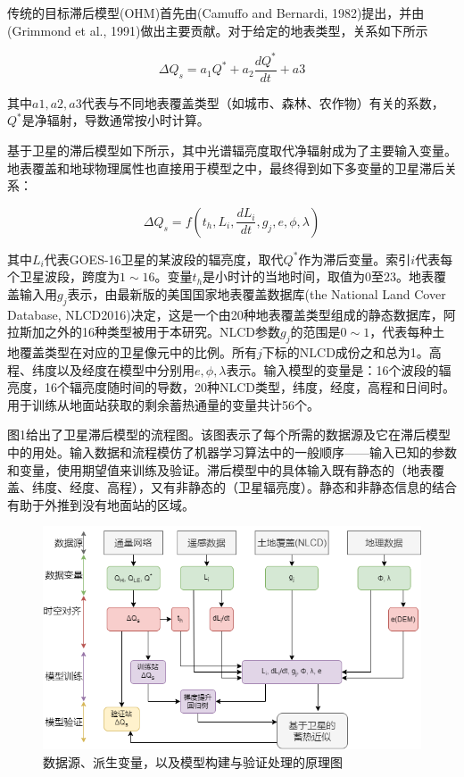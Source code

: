 \documentclass[3p,times]{elsarticle}
\begin{document}
传统的目标滞后模型(OHM)首先由(Camuffo and Bernardi, 1982)提出，并由(Grimmond et al., 1991)做出主要贡献。对于给定的地表类型，关系如下所示

\begin{equation}
    \Delta Q_s=a_1Q^*+a_2\frac{dQ^*}{dt}+a3
\end{equation}

其中$a1,a2,a3$代表与不同地表覆盖类型（如城市、森林、农作物）有关的系数，$Q^*$是净辐射，导数通常按小时计算。

基于卫星的滞后模型如下所示，其中光谱辐亮度取代净辐射成为了主要输入变量。地表覆盖和地球物理属性也直接用于模型之中，最终得到如下多变量的卫星滞后关系：

\begin{equation}
    \Delta Q_s=f(t_h,L_i,\frac{dL_i}{dt},g_j,e,\phi,\lambda)
\end{equation}

其中$L_i$代表GOES-16卫星的某波段的辐亮度，取代$Q^*$作为滞后变量。索引$i$代表每个卫星波段，跨度为$1\sim16$。变量$t_h$是小时计的当地时间，取值为$0$至$23$。地表覆盖输入用$g_j$表示，由最新版的美国国家地表覆盖数据库(the National Land Cover Database, NLCD2016)决定，这是一个由20种地表覆盖类型组成的静态数据库，阿拉斯加之外的16种类型被用于本研究。NLCD参数$g_j$的范围是$0\sim1$，代表每种土地覆盖类型在对应的卫星像元中的比例。所有$j$下标的NLCD成份之和总为1。高程、纬度以及经度在模型中分别用$e,\phi,\lambda$表示。输入模型的变量是：16个波段的辐亮度，16个辐亮度随时间的导数，20种NLCD类型，纬度，经度，高程和日间时。用于训练从地面站获取的剩余蓄热通量的变量共计56个。

图1给出了卫星滞后模型的流程图。该图表示了每个所需的数据源及它在滞后模型中的用处。输入数据和流程模仿了机器学习算法中的一般顺序——输入已知的参数和变量，使用期望值来训练及验证。滞后模型中的具体输入既有静态的（地表覆盖、纬度、经度、高程），又有非静态的（卫星辐亮度）。静态和非静态信息的结合有助于外推到没有地面站的区域。

\begin{figure}[htbp]
    \begin{center}
        \includegraphics[width=\linewidth]{img/图1.png}
    \end{center}
    \caption{数据源、派生变量，以及模型构建与验证处理的原理图}
\end{figure}
\end{document}
